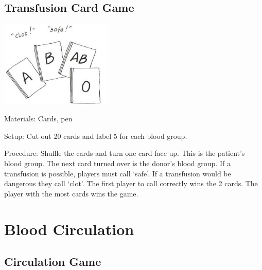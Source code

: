 \begin{multicols}{2}
\subsection{Transfusion Card Game}

\begin{center}
\includegraphics[width=0.4\textwidth]{./img/vso/transfusion-card.jpg}
\end{center}

\begin{description*}
\item[Materials:]{Cards, pen}
\item[Setup:]{Cut out 20 cards and label 5 for each blood group. }
\item[Procedure:]{Shuffle the cards and turn one card face up.
This is the patient's blood group. The next card turned over is the
donor's blood group. If a transfusion is possible, players must call `safe'.
If a transfusion would be dangerous they call `clot'. The first player to
call correctly wins the 2 cards. The player with the most cards wins the game.}
\end{description*}


\section*{Blood Circulation}


\subsection{Circulation Game} %
\label{sub:circulation-game}


\end{multicols}
